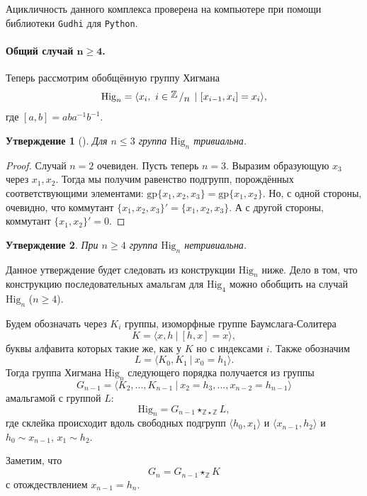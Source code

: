 \documentclass[14pt, dvipsnames, twoside]{extarticle}
\newtheorem{statement}{Утверждение}
\theoremstyle{definition}
\theoremstyle{remark}
\newcommand{\factor}[2]{{\raisebox{.2em}{$#1$}\left/\raisebox{-.2em}{$#2$}\right.}}
\begin{document}
Ацикличность данного комплекса проверена на компьютере при помощи библиотеки {\tt Gudhi} для {\tt Python}.









\paragraph{Общий случай $\bm{n\geqslant 4}$.} Теперь рассмотрим обобщённую группу Хигмана $$\mathrm{Hig}_n=\langle x_i, \ i\in \factor{\mathbb{Z}}{n}\ | \ [x_{i-1}, x_i]=x_i \rangle,$$ где $[a, b]=aba^{-1}b^{-1}$.

\begin{statement}[\cite{Higman}]
Для $n\leqslant 3$ группа $\mathrm{Hig}_n$ тривиальна.
\end{statement}

\begin{proof}
Случай $n = 2$ очевиден. Пусть теперь $n=3$. Выразим образующую $x_3$ через $x_1, x_2$. Тогда мы получим равенство подгрупп, порождённых соответствующими элементами: $\mathrm{gp}\{x_1, x_2, x_3 \}=\mathrm{gp}\{x_1, x_2\}$. Но, с одной стороны, очевидно, что коммутант $\{x_1, x_2, x_3 \}'=\{x_1, x_2, x_3 \}$. А с другой стороны, коммутант $\{x_1, x_2\}'=0$.
\end{proof}

\begin{statement}
При $n\geqslant 4$ группа $\mathrm{Hig}_n$ нетривиальна.
\end{statement}

Данное утверждение будет следовать из конструкции $\mathrm{Hig}_n$ ниже. Дело в том, что конструкцию последовательных амальгам для $\mathrm{Hig}_4$ можно обобщить на случай $\mathrm{Hig}_n$ ($n\geqslant 4$).

Будем обозначать через $K_i$ группы, изоморфные группе Баумслага-Солитера $$K=\langle x, h\ |\ [h, x]=x \rangle,$$ буквы алфавита которых такие же, как у $K$ но с индексами $i$. Также обозначим $$L=\langle K_0, K_1\ |\ x_0=h_1 \rangle.$$ Тогда группа Хигмана $\mathrm{Hig}_n$ следующего порядка получается из группы $$G_{n-1}=\langle K_2, ..., K_{n-1}\ |\ x_2=h_3, ..., x_{n-2}=h_{n-1}\rangle$$ амальгамой с группой $L$: $$\mathrm{Hig}_n=G_{n-1}\star_{\mathbb{Z}\star\mathbb{Z}}L,$$ где склейка происходит вдоль свободных подгрупп $\langle h_0, x_1 \rangle$ и $\langle x_{n-1}, h_2 \rangle$ и  $h_0\sim x_{n-1}$, $x_1\sim h_2$. 

Заметим, что $$G_n=G_{n-1}\star_\mathbb{Z} K$$ с отождествлением $x_{n-1}=h_n$.
\end{document}
